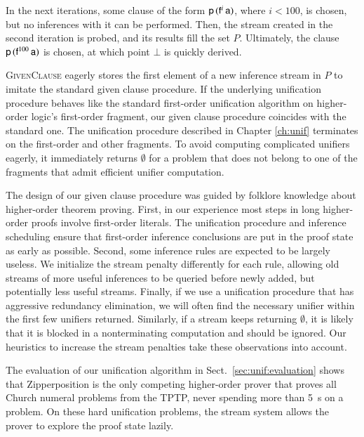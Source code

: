 \begin{exa}
  In the next iterations, some clause of the form $\mathsf{p} \, (\mathsf{f}^{i} \,
  \mathsf{a})$, where $i < 100$, is chosen, but no inferences with it can be
  performed. Then, the stream created in the second iteration is probed, and its
  results fill the set $P$. Ultimately, the clause $\mathsf{p} \, (\mathsf{f}^{100} \,
  \mathsf{a})$ is chosen, at which point $\bot$ is quickly derived.
\end{exa}

\textsc{GivenClause} eagerly stores the first element of a new inference stream
in $P$ to imitate the standard given clause procedure. If the underlying
unification procedure behaves like the standard first-order unification
algorithm on higher-order logic's first-order fragment, our given clause
procedure coincides with the standard one. The unification procedure described in Chapter \ref{ch:unif}
terminates on the first-order and other fragments. To avoid computing
complicated unifiers eagerly, it immediately returns $\emptyset$ for a problem that does not
belong to one of the fragments that admit efficient unifier computation.


The design of our given clause procedure was guided by folklore knowledge about
higher-order theorem proving. First, in our experience most steps in
long higher-order proofs involve first-order literals. The unification
procedure and inference scheduling ensure that first-order inference
conclusions are put in the proof state as early as possible. Second, some
inference rules are expected to be largely useless. We initialize the stream
penalty differently for each rule, allowing old streams of more useful
inferences to be queried before newly added, but potentially less useful
streams. Finally, if we use a unification procedure that has aggressive
redundancy elimination, we will often find the necessary unifier within the
first few unifiers returned. Similarly, if a stream keeps returning
$\emptyset$, it is likely that it is blocked in a nonterminating computation
and should be ignored. Our heuristics to increase the stream penalties take
these observations into account.


\begin{sloppypar}
  
  The evaluation of our unification algorithm in Sect.~\ref{sec:unif:evaluation}
  shows that Zipperposition is the only competing
  higher-order prover that proves all Church numeral problems from the TPTP,
  never spending more than 5~s on a problem. On these hard
  unification problems, the stream system allows the prover to explore the proof
  state lazily.
\end{sloppypar}

